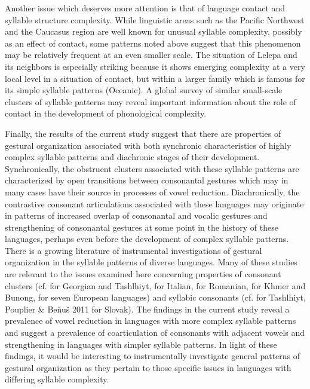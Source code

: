   Another issue which deserves more attention is that of language contact and syllable structure complexity. While linguistic areas such as the Pacific Northwest and the Caucasus region are well known for unusual syllable complexity, possibly as an effect of contact, some patterns noted above suggest that this phenomenon may be relatively frequent at an even smaller scale. The situation of Lelepa and its neighbors is especially striking because it shows emerging complexity at a very local level in a situation of contact, but within a larger family which is famous for its simple syllable patterns (Oceanic). A global survey of similar small-scale clusters of syllable patterns may reveal important information about the role of contact in the development of phonological complexity.

  Finally, the results of the current study suggest that there are properties of gestural organization associated with both synchronic characteristics of highly complex syllable patterns and diachronic stages of their development. Synchronically, the obstruent clusters associated with these syllable patterns are characterized by open transitions between consonantal gestures which may in many cases have their source in processes of vowel reduction. Diachronically, the contrastive consonant articulations associated with these languages may originate in patterns of increased overlap of consonantal and vocalic gestures and strengthening of consonantal gestures at some point in the history of these languages, perhaps even before the development of complex syllable patterns. There is a growing literature of instrumental investigations of gestural organization in the syllable patterns of diverse languages. Many of these studies are relevant to the issues examined here concerning properties of consonant clusters (cf. \citealt{GoldsteinEtAl2007} for Georgian and Tashlhiyt, \citealt{HermesEtAl2013} for Italian, \citealt{Marin2014} for Romanian, \citealt{Butler2015} for Khmer and Bunong, \citealt{MarinEtAl2017} for seven European languages) and syllabic consonants (cf. \citealt{HermesEtAl2011} for Tashlhiyt, Pouplier \& Beňuš 2011 for Slovak). The findings in the current study reveal a prevalence of vowel reduction in languages with more complex syllable patterns and suggest a prevalence of coarticulation of consonants with adjacent vowels and strengthening in languages with simpler syllable patterns. In light of these findings, it would be interesting to instrumentally investigate general patterns of gestural organization as they pertain to those specific issues in languages with differing syllable complexity.


